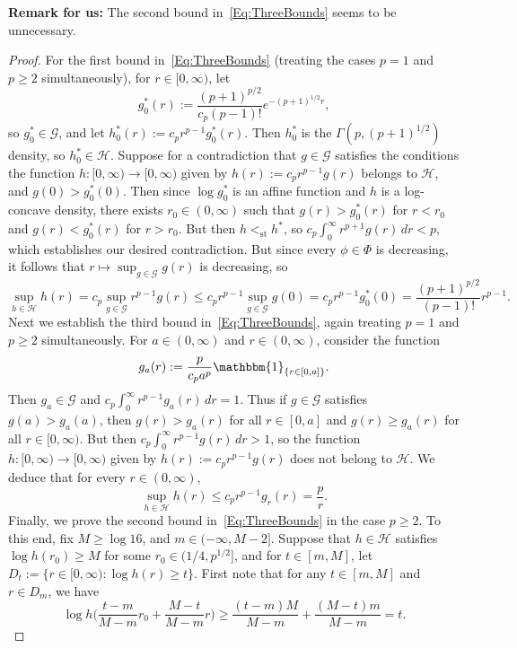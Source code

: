 \documentclass[12pt]{article}
\begin{document}
\textbf{Remark for us:} The second bound in~\eqref{Eq:ThreeBounds} seems to be unnecessary.
\begin{proof}
For the first bound in~\eqref{Eq:ThreeBounds} (treating the cases $p=1$ and $p \geq 2$ simultaneously), for $r \in [0,\infty)$, let 
\[
g_0^*(r) := \frac{(p+1)^{p/2}}{c_p(p-1)!}e^{-(p+1)^{1/2}r},
\]
so $g_0^* \in \mathcal{G}$, and let $h_0^*(r) := c_pr^{p-1}g_0^*(r)$.  Then $h_0^*$ is the $\Gamma(p,(p+1)^{1/2})$ density, so $h_0^* \in \mathcal{H}$.  Suppose for a contradiction that $g \in \mathcal{G}$ satisfies the conditions the function $h:[0,\infty) \rightarrow [0,\infty)$ given by $h(r) := c_pr^{p-1}g(r)$ belongs to $\mathcal{H}$, and $g(0) > g_0^*(0)$.  Then since $\log g_0^*$ is an affine function and $h$ is a log-concave density, there exists $r_0 \in (0,\infty)$ such that $g(r) > g_0^*(r)$ for $r < r_0$ and $g(r) < g_0^*(r)$ for $r > r_0$.  But then $h <_{\mathrm{st}} h^*$, so $c_p \int_0^\infty r^{p+1}g(r) \, dr < p$, which establishes our desired contradiction.  %
But since every $\phi \in \Phi$ is decreasing, it follows that $r \mapsto \sup_{g \in \mathcal{G}} g(r)$ is decreasing, so
\[
\sup_{h \in \mathcal{H}} h(r) = c_p \sup_{g \in \mathcal{G}} r^{p-1} g(r) \leq c_pr^{p-1}\sup_{g \in \mathcal{G}} g(0) = c_pr^{p-1}g_0^*(0) = \frac{(p+1)^{p/2}}{(p-1)!}r^{p-1}.
\]
Next we establish the third bound in~\eqref{Eq:ThreeBounds}, again treating $p=1$ and $p \geq 2$ simultaneously.  For $a \in (0,\infty)$ and $r \in (0,\infty)$, consider the function
\[
g_a(r) := \frac{p}{c_p a^p}\mathbbm{1}_{\{r \in [0,a]\}}.
\]
Then $g_a \in \mathcal{G}$ and $c_p \int_0^\infty r^{p-1}g_a(r) \, dr = 1$.  Thus if $g \in \mathcal{G}$ satisfies $g(a) > g_a(a)$, then $g(r) > g_a(r)$ for all $r \in [0,a]$ and $g(r) \geq g_a(r)$ for all $r \in [0,\infty)$.  But then $c_p \int_0^\infty r^{p-1}g(r) \, dr > 1$, so the function $h:[0,\infty) \rightarrow [0,\infty)$ given by $h(r) := c_pr^{p-1}g(r)$ does not belong to $\mathcal{H}$.  We deduce that for every $r \in (0,\infty)$,
\[
\sup_{h \in \mathcal{H}} h(r) \leq c_pr^{p-1}g_r(r) = \frac{p}{r}.
\]
Finally, we prove the second bound in~\eqref{Eq:ThreeBounds} in the case $p \geq 2$.  To this end, fix $M \geq \log 16$, and $m \in (-\infty,M-2]$.  Suppose that $h \in \mathcal{H}$ satisfies $\log h(r_0) \geq M$ for some $r_0 \in (1/4,p^{1/2}]$, and for $t \in [m,M]$, let $D_t := \{r \in [0,\infty):\log h(r) \geq t\}$.  First note that for any $t \in [m,M]$ and $r \in D_m$, we have
\[
\log h\biggl(\frac{t-m}{M-m}r_0 + \frac{M-t}{M-m}r\biggr) \geq \frac{(t-m)M}{M-m} + \frac{(M-t)m}{M-m} = t.
\]
\end{proof}
\end{document}
